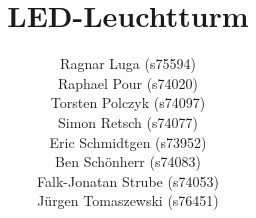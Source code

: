 \makeatletter
\gdef\@islecture{\relax}
\makeatother

\subject{Software Engineering 2}
\title{LED-Leuchtturm}
\author{
\texorpdfstring{Ragnar Luga		 (s75594)\\
Raphael Pour									 (s74020)\\
Torsten Polczyk								 (s74097)\\
Simon Retsch									 (s74077)\\
Eric Schmidtgen								 (s73952)\\
Ben Schönherr								 (s74083)\\
Falk-Jonatan Strube						 (s74053)\\
Jürgen Tomaszewski						 (s76451)\\\vspace*{-1em}}{
Ragnar Luga,
Raphael Pour,
Torsten Polczyk,
Simon Retsch,
Erik Schmidtgen,
Ben Schoenherr,
Falk-Jonatan Strube,
Jürgen Tomaszewski
}
}

\let\tableofcontentsORIG\tableofcontents
\renewcommand\tableofcontents{\tableofcontentsORIG\clearpage}
